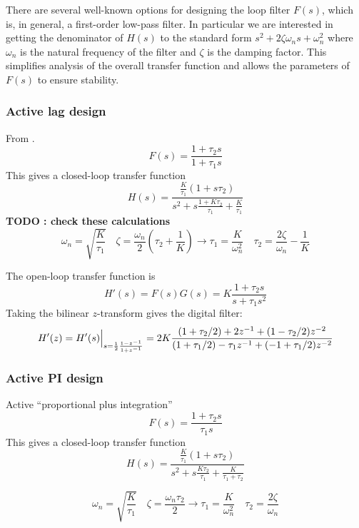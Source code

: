 There are several well-known options for designing the loop filter $F(s)$,
which is, in general, a first-order low-pass filter.
In particular we are interested in getting the denominator of $H(s)$ to the
standard form $s^2 + 2\zeta\omega_n s + \omega_n^2$ where $\omega_n$ is the
natural frequency of the filter and $\zeta$ is the damping factor.
This simplifies analysis of the overall transfer function and allows the
parameters of $F(s)$ to ensure stability.

\subsubsection{Active lag design}
From \cite{Best:1997}.
\[
    F(s) = \frac{1 + \tau_2 s}{1 + \tau_1 s}
\]
This gives a closed-loop transfer function
\[
    H(s) = \frac{
                \frac{K}{\tau_1} (1 + s\tau_2)
           } {
                s^2 + s\frac{1 + K\tau_2}{\tau_1} + \frac{K}{\tau_1}
           }
\]
{\bf TODO : check these calculations}
\[
    \omega_n = \sqrt{\frac{K}{\tau_1}}
    \,\,\,\,\,\,
    \zeta = \frac{\omega_n}{2}\left(\tau_2 + \frac{1}{K}\right)
        \rightarrow
    \tau_1 = \frac{K}{\omega_n^2}
    \,\,\,\,\,\,
    \tau_2 = \frac{2\zeta}{\omega_n} - \frac{1}{K}
\]

The open-loop transfer function is
\[
    H'(s) = F(s)G(s) = K \frac{1 + \tau_2 s}{s + \tau_1 s^2}
\]
Taking the bilinear $z$-transform gives the digital filter:
\[
    H'(z) = H'(s)\Bigl.\Bigr|_{s = \frac{1}{2}\frac{1-z^{-1}}{1+z^{-1}}}
          = 2 K \frac{
                (1+\tau_2/2) + 2 z^{-1}     + ( 1 - \tau_2/2)z^{-2}
          } {
                (1+\tau_1/2) -\tau_1 z^{-1} + (-1 + \tau_1/2)z^{-2}
          }
\]



\subsubsection{Active PI design}
Active ``proportional plus integration''
\[
    F(s) = \frac{1 + \tau_2 s}{\tau_1 s}
\]
This gives a closed-loop transfer function
\[
    H(s) = \frac{
                \frac{K}{\tau_1} (1 + s\tau_2)
           } {
                s^2 + s\frac{K\tau_2}{\tau_1} + \frac{K}{\tau_1 + \tau_2}
           }
\]

\[
    \omega_n = \sqrt{\frac{K}{\tau_1}}
    \,\,\,\,\,\,
    \zeta = \frac{\omega_n \tau_2}{2}
        \rightarrow
    \tau_1 = \frac{K}{\omega_n^2}
    \,\,\,\,\,\,
    \tau_2 = \frac{2\zeta}{\omega_n}
\]

